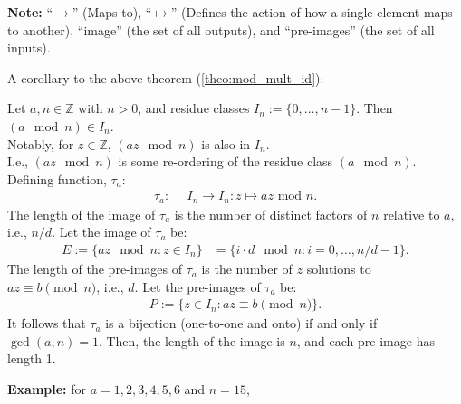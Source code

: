 \newpage

\begin{Note}
    \textbf{Note:} ``$\rightarrow$'' (Maps to), ``$\mapsto$'' (Defines the action of how a single element maps to another), ``image'' (the set of all outputs), and ``pre-images'' (the set of all inputs).
\end{Note}

\noindent
A corollary to the above theorem (\ref{theo:mod_mult_id}):
\begin{theo}

    Let $a,n\in \mathbb{Z}$ with $n>0$, and residue classes $I_n:=\{0,\dots,n-1\}$. Then $(a \mod n)\in I_n$.\\
    Notably, for $z\in\mathbb{Z}$, $(az \mod n)$ is also in $I_n$.\\

    \noindent
    I.e., $(az \mod n)$ is some re-ordering of the residue class $(a \mod n)$. Defining function, $\tau_a$:
    \begin{align*}
        \tau_a:&\enspace I_n \rightarrow I_n: z \mapsto az \text{ mod } n. \tag{3.2.1}
    \end{align*}
    The length of the image of $\tau_a$ is the number of distinct factors of $n$ relative to $a$, i.e., $n/d$. Let the image of $\tau_a$ be:
    \begin{align*}
        E := \{az \mod n : z \in I_n\} &= \{i \cdot d \mod n : i = 0, \dots, n/d - 1\}. \tag{3.2.2}
    \end{align*}
    The length of the pre-images of $\tau_a$ is the number of $z$ solutions to $az\equiv b \pmod{n}$, i.e., $d$. Let the pre-images of $\tau_a$ be:
    \begin{align*}
        P := \{z \in I_n : az \equiv b \pmod{n}\}. \tag{3.2.3}
    \end{align*}
    It follows that $\tau_a$ is a bijection (one-to-one and onto) if and only if $\gcd(a, n) = 1$. Then, the length of the image is $n$, and each pre-image has length 1.

\end{theo}
\textbf{Example:} for $a=1,2,3,4,5,6$ and $n=15$,
